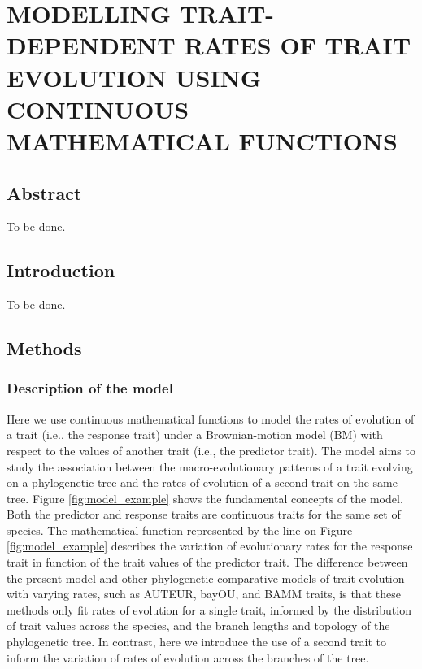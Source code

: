 
\chapter{MODELLING TRAIT-DEPENDENT RATES OF TRAIT EVOLUTION USING CONTINUOUS MATHEMATICAL FUNCTIONS}

\section{Abstract}

To be done.

\section{Introduction}

To be done.

\section{Methods}

\subsection{Description of the model}

Here we use continuous mathematical functions to model the rates of evolution of a trait (i.e., the response trait) under a Brownian-motion model (BM) with respect to the values of another trait (i.e., the predictor trait). The model aims to study the association between the macro-evolutionary patterns of a trait evolving on a phylogenetic tree and the rates of evolution of a second trait on the same tree. Figure \ref{fig:model_example} shows the fundamental concepts of the model. %
Both the predictor and response traits are continuous traits for the same set of species. The mathematical function represented by the line on Figure \ref{fig:model_example} describes the variation of evolutionary rates for the response trait in function of the trait values of the predictor trait. The difference between the present model and other phylogenetic comparative models of trait evolution with varying rates, such as AUTEUR, bayOU, and BAMM traits, is that these methods only fit rates of evolution for a single trait, informed by the distribution of trait values across the species, and the branch lengths and topology of the phylogenetic tree. In contrast, here we introduce the use of a second trait to inform the variation of rates of evolution across the branches of the tree.

